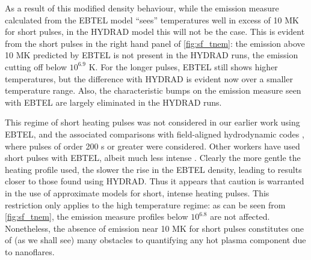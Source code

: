 \documentclass[apj]{emulateapj}
\begin{document}
\par As a result of this modified density behaviour, while the emission measure calculated from the EBTEL model ``sees'' temperatures well in excess of 10 MK for short pulses, in the HYDRAD model this will not be the case. This is evident from the short pulses in the right hand panel of \autoref{fig:sf_tnem}: the emission above 10 MK predicted by EBTEL is not present in the HYDRAD runs, the emission cutting off below $10^{6.9}$ K. For the longer pulses, EBTEL still shows higher temperatures, but the difference with HYDRAD is evident now over a smaller temperature range. Also, the characteristic bumps on the emission measure seen with EBTEL are largely eliminated in the HYDRAD runs.

\par This regime of short heating pulses was not considered in our earlier work using EBTEL, and the associated comparisons with field-aligned hydrodynamic codes \citep{klimchuk_highly_2008,cargill_enthalpy-based_2012}, where pulses of order 200 s or greater were considered. Other workers have used short pulses with EBTEL, albeit much less intense \citep{tajfirouze_euv_2016,tajfirouze_time-resolved_2016}. Clearly the more gentle the heating profile used, the slower the rise in the EBTEL density, leading to results closer to those found using HYDRAD. Thus it appears that caution is warranted in the use of approximate models for short, intense heating pulses. This restriction only applies to the high temperature regime: as can be seen from \autoref{fig:sf_tnem}, the emission measure profiles below $10^{6.8}$ are not affected. Nonetheless, the absence of emission near 10 MK for short pulses constitutes one of (as we shall see) many obstacles to quantifying any hot plasma component due to nanoflares.
\end{document}
